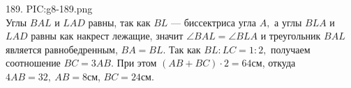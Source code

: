 189. {{PIC:g8-189.png}}\\
Углы $BAL$ и $LAD$ равны, так как $BL$ --- биссектриса угла $A,$ а углы $BLA$ и $LAD$ равны как накрест лежащие, значит $\angle BAL=\angle BLA$ и треугольник $BAL$ является равнобедренным, $BA=BL.$ Так как $BL:LC=1:2,$ получаем соотношение $BC=3AB.$ При этом $(AB+BC)\cdot2=64$см, откуда $4AB=32,\ AB=8$см, $BC=24$см.\newpage\noindent
